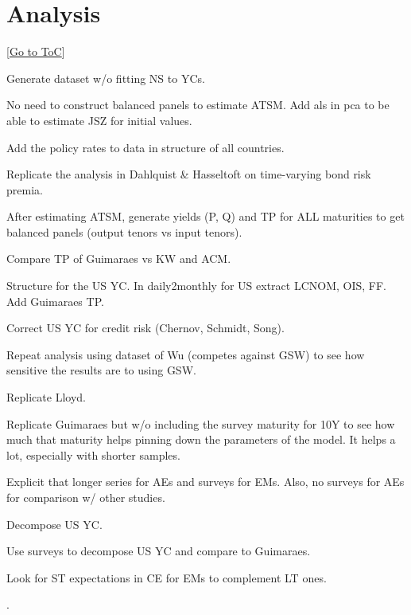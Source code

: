 \documentclass[12pt]{article}
\newcommand{\gototoc}{\vspace{-1.8cm} \null\hfill [\hyperlink{toc}{Go to ToC}] \newline}
\newcommand{\cmark}{\ding{51}}
\newcommand{\done}{\rlap{$\square$}{\raisebox{2pt}{\large\hspace{1pt}\cmark}}%
	\hspace{-2.5pt}}
\begin{document}
\section{Analysis}
\gototoc
\begin{todolist}
	\item Generate dataset w/o fitting NS to YCs.
	\item No need to construct balanced panels to estimate ATSM. Add als in pca to be able to estimate JSZ for initial values.
	\item Add the policy rates to data in structure of all countries.
	\item Replicate the analysis in Dahlquist \& Hasseltoft on time-varying bond risk premia.
	\item After estimating ATSM, generate yields (P, Q) and TP for ALL maturities to get balanced panels (output tenors vs input tenors).
	\item Compare TP of Guimaraes vs KW and ACM.
	\item Structure for the US YC. In daily2monthly for US extract LCNOM, OIS, FF. Add Guimaraes TP.
	\item Correct US YC for credit risk (Chernov, Schmidt, Song).
	\item Repeat analysis using dataset of Wu (competes against GSW) to see how sensitive the results are to using GSW.
	\item Replicate Lloyd.
	\item[\done] Replicate Guimaraes but w/o including the survey maturity for 10Y to see how much that maturity helps pinning down the parameters of the model. It helps a lot, especially with shorter samples.
	\item[\done] Explicit that longer series for AEs and surveys for EMs. Also, no surveys for AEs for comparison w/ other studies. %
	\item[\done] Decompose US YC.
	\item[\done] Use surveys to decompose US YC and compare to Guimaraes.
	\item[\done] Look for ST expectations in CE for EMs to complement LT ones.
	\begin{todolist}
		\item .
	\end{todolist}
\end{todolist}
\end{document}
